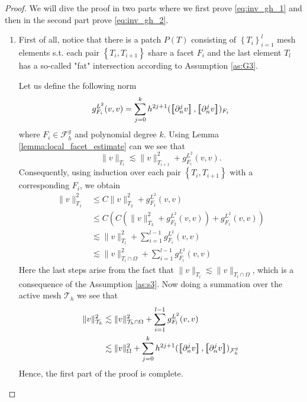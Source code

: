 \begin{proof}
    We will dive the proof in two parts where we first prove \eqref{eq:inv_gh_1} and then in the second part prove \eqref{eq:inv_gh_2}.
    \begin{enumerate}[label=\arabic*)]
        \item
            First of all, notice that there is a patch $P(T) $ consisting of $\left\{ T_{i} \right\}_{i=1}^{l} $ mesh elements s.t. each pair $ \left\{ T_{i}, T_{i+1} \right\} $ share a facet $F_{i}$ and the last element $T_{l}$ has a so-called "fat"
            intersection according to Assumption \ref{as:G3}.

            Let us define the following norm \[
            g_{F_{i}}^{L^{2}}( v,v)  = \sum_{j=0}^{k} h^{2j+1}( \jump{ \partial ^{j}_{n}v }, \jump{ \partial ^{j}_{n}v }    )_{F_{i} }
            \]
            where $F_{i} \in  \mathcal{F} ^{g}_{h}$ and polynomial degree $ k$. Using Lemma \ref{lemma:local_facet_estimate} can we see that \[
            \| v \|_{ T_{i} }^{  } \lesssim \| v \|_{ T_{i+1} }^{ 2 } + g_{F_{i}}^{L^{2}}( v,v).
            \]
    Consequently, using induction over each pair $\left\{ T_{i}, T_{i+1} \right\} $ with a corresponding $F_{i}$, we obtain
            \[
                \begin{split}
            \| v \|_{ T_{1} }^{2  }  & \le  C \| v \|_{ T_{2} }^{ 2 } + g_{F_{1}}^{L^{2}}( v,v)\\
              & \le  C( C( \| v \|_{ T_{3} }^{ 2 } + g_{F_{2}}^{L^{2}}( v,v) ) + g_{F_{1}}^{L^{2}}( v,v) )\\
              & \lesssim    \| v \|_{ T_{l} }^{ 2 }  + \sum_{i=1}^{l-1} g_{F_{i}}^{L^{2}}( v,v)  \\
              & \lesssim    \| v \|_{ T_{l} \cap \Omega  }^{ 2 }  + \sum_{i=1}^{l-1} g_{F_{i}}^{L^{2}}( v,v)
                \end{split}
            \]
            Here the last steps arise from the fact that $\|  v \|_{ T_{l} }^{  } \lesssim  \|  v \|_{ T_{l} \cap \Omega  }^{  }  $, which is a consequence of the Assumption \ref{as:s3}.
            Now doing a summation over the active mesh $\mathcal{T} _{h}$ we see that
            \[
                \begin{split}
                    \| v \|_{ \mathcal{T} _{h} }^{2  } &\lesssim \| v \|_{ \mathcal{T} _{h}\cap \Omega  }^{2  }+ \sum_{i=1}^{l-1} g_{F_{l}}^{L^{2}}( v,v) \\
                     &\lesssim \| v \|_{ \Omega  }^{ 2 }  + \sum_{j=0}^{k} h^{2j+1} ( \jump{ \partial ^{j}_{n} v }, \jump{ \partial ^{j}_{n}v }    )_{\mathcal{F}_{h}^{g}}
                \end{split}
        \]
        Hence, the first part of the proof is complete.


\end{enumerate}
\end{proof}
